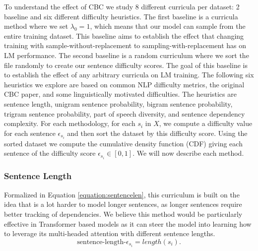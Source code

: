 To understand the effect of CBC we study 8 different curricula per dataset: 2 baseline and six different difficulty heuristics. The first baseline is a curricula method where we set $\lambda_0 = 1$, which means that our model can sample from the entire training dataset. This baseline aims to establish the effect that changing training with sample-without-replacement to sampling-with-replacement has on LM performance. The second baseline is a random curriculum where we sort the file randomly to create our sentence difficulty scores. The goal of this baseline is to establish the effect of any arbitrary curricula on LM training. The following six heuristics we explore are based on common NLP difficulty metrics, the original CBC paper, and some linguistically motivated difficulties. The heuristics are sentence length, unigram sentence probability, bigram sentence probability, trigram sentence probability, part of speech diversity, and sentence dependency complexity. For each methodology, for each $s_i$ in $X$, we compute a difficulty value for each sentence $\epsilon_{s_i}$ and then sort the dataset by this difficulty score. Using the sorted dataset we compute the cumulative density function (CDF) giving each sentence of the difficulty score $\epsilon_{s_i} \in [0,1]$. We will now describe each method.
\subsubsection{Sentence Length}
Formalized in Equation \ref{equation:sentencelen}, this curriculum is built on the idea that is a lot harder to model longer sentences, as longer sentences require better tracking of dependencies. We believe this method would be particularly effective in Transformer based models as it can steer the model into learning how to leverage its multi-headed attention with different sentence lengths. \begin{equation}
    \text{sentence-length-}\epsilon_{s_i} = length(s_i).
    \label{equation:sentencelen}
\end{equation} 
